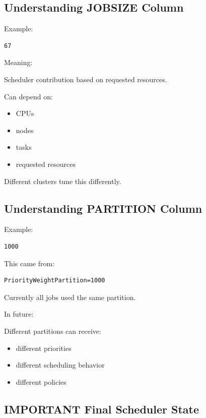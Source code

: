\documentclass[11pt]{article}
\begin{document}
\subsection{Understanding JOBSIZE Column}
\label{sec:org7ddc006}

Example:

\begin{verbatim}
67
\end{verbatim}

Meaning:

Scheduler contribution based on requested resources.

Can depend on:

\begin{itemize}
\item CPUs
\item nodes
\item tasks
\item requested resources
\end{itemize}

Different clusters tune this differently.
\subsection{Understanding PARTITION Column}
\label{sec:org1d36189}

Example:

\begin{verbatim}
1000
\end{verbatim}

This came from:

\begin{verbatim}
PriorityWeightPartition=1000
\end{verbatim}

Currently all jobs used the same partition.

In future:

Different partitions can receive:

\begin{itemize}
\item different priorities
\item different scheduling behavior
\item different policies
\end{itemize}
\subsection{IMPORTANT Final Scheduler State}
\label{sec:orge8240d5}
\end{document}
